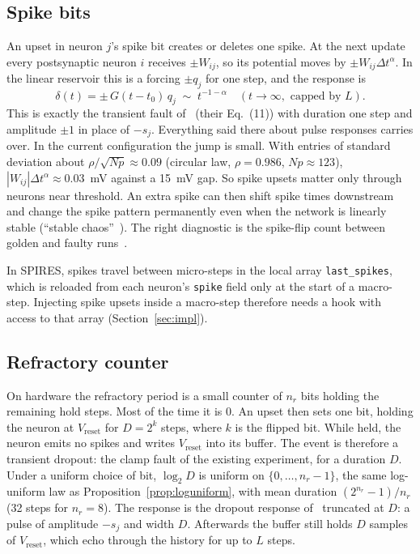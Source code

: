 \documentclass[11pt,a4paper]{article}
\newcommand{\dta}{\Delta t^{\alpha}}
\begin{document}
\subsection{Spike bits}
\label{sec:spike}

An upset in neuron $j$'s spike bit creates or deletes one spike. At the next update every postsynaptic neuron $i$ receives $\pm W_{ij}$, so its potential moves by $\pm W_{ij}\dta$. In the linear reservoir this is a forcing $\pm q_j$ for one step, and the response is
\begin{equation}
\delta(t) = \pm\, G(t - t_0)\, q_j \;\sim\; t^{-1-\alpha} \quad (t\to\infty, \text{ capped by } L).
\end{equation}
This is exactly the transient fault of~\cite{dropout2026} (their Eq.~(11)) with duration one step and amplitude $\pm1$ in place of $-s_j$. Everything said there about pulse responses carries over. In the current configuration the jump is small. With entries of standard deviation about $\rho/\sqrt{Np} \approx 0.09$ (circular law, $\rho = 0.986$, $Np \approx 123$), $|W_{ij}|\dta \approx 0.03$~mV against a 15~mV gap. So spike upsets matter only through neurons near threshold. An extra spike can then shift spike times downstream and change the spike pattern permanently even when the network is linearly stable (``stable chaos''~\cite{jahnke2008}). The right diagnostic is the spike-flip count between golden and faulty runs~\cite{dropout2026}.

In SPIRES, spikes travel between micro-steps in the local array \texttt{last\_spikes}, which is reloaded from each neuron's \texttt{spike} field only at the start of a macro-step. Injecting spike upsets inside a macro-step therefore needs a hook with access to that array (Section~\ref{sec:impl}).

\subsection{Refractory counter}
\label{sec:refrac}

On hardware the refractory period is a small counter of $n_r$ bits holding the remaining hold steps. Most of the time it is 0. An upset then sets one bit, holding the neuron at $V_{\mathrm{reset}}$ for $D = 2^{k}$ steps, where $k$ is the flipped bit. While held, the neuron emits no spikes and writes $V_{\mathrm{reset}}$ into its buffer. The event is therefore a transient dropout: the clamp fault of the existing experiment, for a duration $D$. Under a uniform choice of bit, $\log_2 D$ is uniform on $\{0, \dots, n_r - 1\}$, the same log-uniform law as Proposition~\ref{prop:loguniform}, with mean duration $(2^{n_r}-1)/n_r$ (32 steps for $n_r = 8$). The response is the dropout response of~\cite{dropout2026} truncated at $D$: a pulse of amplitude $-s_j$ and width $D$. Afterwards the buffer still holds $D$ samples of $V_{\mathrm{reset}}$, which echo through the history for up to $L$ steps.
\end{document}

